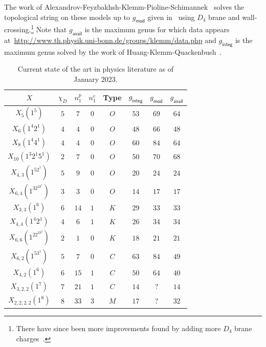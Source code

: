 \documentclass[10pt,oldfontcommands,oneside]{memoir}
\theoremstyle{definition}
\theoremstyle{remark}
\theoremstyle{plain}
\theoremstyle{definition}
\theoremstyle{remark}
\newcommand{\ms}[1]{\mathsf{#1}}
\newcommand{\1}{\mathbf{1}}
\newcommand{\2}{\mathbf{2}}
\newcommand{\3}{\mathbf{3}}
\begin{document}
The work of Alexandrov-Feyzbakhsh-Klemm-Pioline-Schimannek~\cite{qgeommod} solves the topological string on these models up to $g_{\ms{mod}}$ given in~ using $D_4$ brane and wall-crossing.\footnote{There have since been more improvements found by adding more $D_4$ brane charges~\cite{qgmm}.} Note that $g_{\ms{avail}}$ is the maximum genus for which data appears at~\url{http://www.th.physik.uni-bonn.de/groups/klemm/data.php} and $g_{\ms{integ}}$ is the maximum genus solved by the work of Huang-Klemm-Quackenbush~\cite{hkq}. 
\begin{table}[htpb]
    \centering
    \caption{Current state of the art in physics literature as of January 2023.}
    \label{tab:stateofart}
    \begin{tabular}{cccccccc}
        \toprule
        $X$                   & $\chi_D$ & $n_1^p$ & $n_1^c$ & Type & $g_{\ms{integ}}$ & $g_{\ms{mod}}$ & $g_{\ms{avail}}$ \\
        \midrule
        $X_5(1^5)$            & $5$ & $7$ & $0$ & $O$ & $53$ & $69$ & $64$ \\
        $X_6(1^4 2^1)$        & $4$ & $4$ & $0$ & $O$ & $48$ & $66$ & $48$ \\
        $X_8(1^4 4^1)$        & $4$ & $4$ & $0$ & $O$ & $60$ & $84$ & $64$ \\
        $X_{10}(1^3 2^1 5^1)$ & $2$ & $7$ & $0$ & $O$ & $50$ & $70$ & $68$ \\
        $X_{4,3}(1^52^1)$     & $5$ & $9$ & $0$ & $O$ & $20$ & $24$ & $24$ \\
        $X_{6,4}(1^32^23^1)$  & $3$ & $3$ & $0$ & $O$ & $14$ & $17$ & $17$ \\
        $X_{3,3}(1^6)$        & $6$ & $14$ & $1$ & $K$ & $29$ & $33$ & $33$ \\
        $X_{4,4}(1^4 2^1)$    & $4$ & $6$ & $1$ & $K$ & $26$ & $34$ & $34$ \\
        $X_{6,6}(1^22^23^2)$  & $2$ & $1$ & $0$ & $K$ & $18$ & $21$ & $21$ \\
        $X_{6,2}(1^53^1)$     & $5$ & $7$ & $0$ & $C$ & $63$ & $84$ & $49$ \\
        $X_{4,2}(1^6)$        & $6$ & $15$ & $1$ & $C$ & $50$ & $64$ & $40$ \\
        $X_{3,2,2}(1^7)$      & $7$ & $21$ & $1$ & $C$ & $14$ & $?$ & $14$ \\
        $X_{2,2,2,2}(1^8)$    & $8$ & $33$ & $3$ & $M$ & $17$ & $?$ & $32$ \\
        \bottomrule
    \end{tabular}
\end{table}
\end{document}
